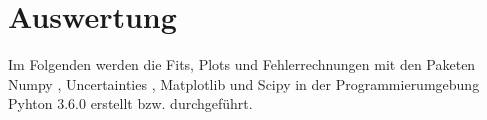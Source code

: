 \section{Auswertung}
\label{sec:Auswertung}




Im Folgenden werden die Fits, Plots und Fehlerrechnungen mit den Paketen Numpy \cite{numpy}, Uncertainties \cite{uncertainties},
Matplotlib \cite{matplotlib} und Scipy \cite{scipy} in der Programmierumgebung Pyhton 3.6.0 erstellt bzw. durchgeführt.
